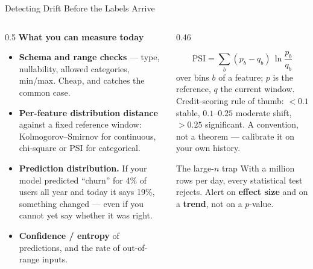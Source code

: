 
\begin{frame}{Detecting Drift Before the Labels Arrive}

    \begin{columns}[T]
        \begin{column}{0.5\textwidth}
            \small
            \textbf{What you can measure today}
            \begin{itemize}
                \item \textbf{Schema and range checks} --- type, nullability, allowed categories, min/max.
                      Cheap, and catches the common case.
                \item \textbf{Per-feature distribution distance} against a fixed reference window:
                      Kolmogorov--Smirnov for continuous, chi-square or PSI for categorical.
                \item \textbf{Prediction distribution.} If your model predicted ``churn'' for 4\% of users
                      all year and today it says 19\%, something changed --- even if you cannot yet say
                      whether it was right.
                \item \textbf{Confidence / entropy} of predictions, and the rate of out-of-range inputs.
            \end{itemize}
        \end{column}
        \begin{column}{0.46\textwidth}
            \begin{tcolorbox}[colback=gray!8, colframe=gray!60, title=\small Population Stability Index]
                \small
                \[ \mathrm{PSI} = \sum_{b} (p_b - q_b)\,\ln\!\frac{p_b}{q_b} \]
                over bins $b$ of a feature; $p$ is the reference, $q$ the current window.
                \vspace{0.3em}
                \\ \scriptsize Credit-scoring rule of thumb: $<0.1$ stable, $0.1$--$0.25$ moderate shift,
                $>0.25$ significant. A convention, not a theorem --- calibrate it on your own history.
            \end{tcolorbox}
            \vspace{0.4em}
            \begin{alertblock}{\small The large-$n$ trap}
                \small With a million rows per day, every statistical test rejects. Alert on
                \textbf{effect size} and on a \textbf{trend}, not on a $p$-value.
            \end{alertblock}
        \end{column}
    \end{columns}

\end{frame}
